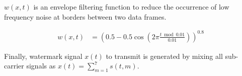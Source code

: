 $w(x, t)$ is an envelope filtering function to reduce the occurrence of low frequency noise at borders between two data frames.

\begin{align}
w(x, t) &= (0.5 - 0.5\cos{( 2 \pi \frac{t \bmod 0.01}{0.01} )}) ^{0.8}
\end{align}

Finally, watermark signal $x(t)$ to transmit is generated by mixing all sub-carrier signals as $ x(t) = \sum^{7}_{m=1} s(t, m) $.
